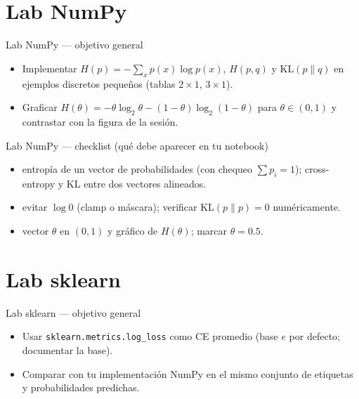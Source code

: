 \section[Lab NumPy]{Lab NumPy\label{sec:labnumpy-w06}}

\begin{frame}{Lab NumPy — objetivo general}
\begin{itemize}
  \item Implementar \(H(p)=-\sum_x p(x)\log p(x)\), \(H(p,q)\) y \(\mathrm{KL}(p\|q)\) en ejemplos discretos pequeños (tablas \(2\times 1\), \(3\times 1\)).
  \item Graficar \(H(\theta)=-\theta\log_2\theta-(1-\theta)\log_2(1-\theta)\) para \(\theta\in(0,1)\) y contrastar con la figura de la sesión.
\end{itemize}
\end{frame}

\begin{frame}{Lab NumPy — checklist (qué debe aparecer en tu notebook)}
\small
\begin{itemize}
  \item {} entropía de un vector de probabilidades (con chequeo \(\sum p_i=1\)); cross-entropy y KL entre dos vectores alineados.
  \item {} evitar \(\log 0\) (clamp o máscara); verificar \(\mathrm{KL}(p\|p)=0\) numéricamente.
  \item {} vector \(\theta\) en \((0,1)\) y gráfico de \(H(\theta)\); marcar \(\theta=0.5\).
\end{itemize}
\end{frame}

\section[Lab sklearn]{Lab sklearn\label{sec:labsklearn-w06}}

\begin{frame}{Lab sklearn — objetivo general}
\begin{itemize}
  \item Usar \texttt{sklearn.metrics.log\_loss} como CE promedio (base \(e\) por defecto; documentar la base).
  \item Comparar con tu implementación NumPy en el mismo conjunto de etiquetas y probabilidades predichas.
\end{itemize}
\end{frame}

